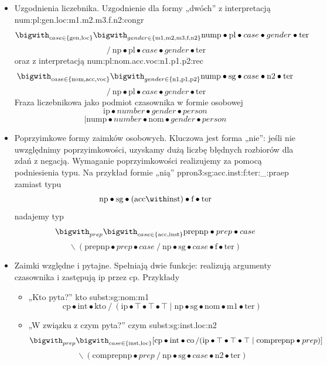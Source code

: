 \documentclass[oneside,pwrcover,withmarginpar,hidelinks,11pt]{article}
\newcommand{\tensor}{\bullet}
\newcommand{\forward}{\operatorname{/}}
\newcommand{\backward}{\operatorname{\backslash}}
\newcommand{\both}{\mid}
\begin{document}
\begin{itemize}
\item Uzgodnienia liczebnika.
Uzgodnienie dla formy „dwóch” z interpretacją num:pl:gen.loc:m1.m2.m3.f.n2:congr
\[\bigwith_{case\in\{\text{gen},\text{loc}\}}\bigwith_{gender\in\{\text{m1},\text{m2},\text{m3},\text{f},\text{n2}\}}
\text{nump}\tensor\text{pl}\tensor case\tensor gender\tensor\text{ter}\]\[\forward
\text{np}\tensor\text{pl}\tensor case\tensor gender\tensor\text{ter}\]
oraz z interpretacją num:pl:nom.acc.voc:n1.p1.p2:rec
\[\bigwith_{case\in\{\text{nom},\text{acc},\text{voc}\}}\bigwith_{gender\in\{\text{n1},\text{p1},\text{p2}\}}
\text{nump}\tensor\text{sg}\tensor case\tensor\text{n2}\tensor\text{ter}\]\[\forward
\text{np}\tensor\text{pl}\tensor case\tensor gender\tensor\text{ter}\]
Fraza liczebnikowa jako podmiot czasownika w formie osobowej
\[\text{ip}\tensor number\tensor gender\tensor person\]\[\both
\text{nump}\tensor number\tensor\text{nom}\tensor gender\tensor person\]
\item Poprzyimkowe formy zaimków osobowych.
Kluczowa jest forma „nie”: jeśli nie uwzględnimy poprzyimkowości, uzyskamy dużą liczbę błędnych rozbiorów dla zdań z negacją.
Wymaganie poprzyimkowości realizujemy za pomocą podniesienia typu.
Na przykład formie „nią” ppron3:sg:acc.inst:f:ter:\_:praep zamiast typu
\[\text{np}\tensor\text{sg}\tensor(\text{acc}\with\text{inst})\tensor\text{f}\tensor\text{ter}\]
nadajemy typ
\[\bigwith_{prep}\bigwith_{case\in\{\text{acc},\text{inst}\}}\text{prepnp}\tensor prep\tensor case\]\[\backward(
\text{prepnp}\tensor prep\tensor case\forward
\text{np}\tensor\text{sg}\tensor case\tensor\text{f}\tensor\text{ter})\]
\item Zaimki względne i pytajne.
Spełniają dwie funkcje: realizują argumenty czasownika i zastępują ip przez cp. Przykłady
\begin{itemize}
\item „Kto pyta?”	kto	subst:sg:nom:m1
\[\text{cp}\tensor\text{int}\tensor\text{kto}\forward
(\text{ip}\tensor\top\tensor\top\tensor\top\both\text{np}\tensor\text{sg}\tensor\text{nom}\tensor\text{m1}\tensor\text{ter})\]
\item „W związku z czym pyta?”	czym 	subst:sg:inst.loc:n2
\[\bigwith_{prep}\bigwith_{case\in\{\text{inst},\text{loc}\}}
[\text{cp}\tensor\text{int}\tensor\text{co}\forward
(\text{ip}\tensor\top\tensor\top\tensor\top\both\text{comprepnp}\tensor prep)]\]
\[\backward(\text{comprepnp}\tensor prep\forward\text{np}\tensor\text{sg}\tensor case\tensor\text{n2}\tensor\text{ter})\]

\end{itemize}
\end{itemize}
\end{document}
